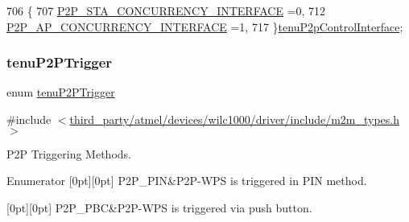 \begin{DoxyCode}
706              \{
707     \hyperlink{group__WlanEnums_ggaa1d900506fae03d738ed81234d0a4633acbbb47272c24868f48d51875ce99008b}{P2P\_STA\_CONCURRENCY\_INTERFACE}  =0,
712     \hyperlink{group__WlanEnums_ggaa1d900506fae03d738ed81234d0a4633a78839b56cae7844156e76d29f090dbf8}{P2P\_AP\_CONCURRENCY\_INTERFACE}    =1,
717 \}\hyperlink{group__WlanEnums_gaa1d900506fae03d738ed81234d0a4633}{tenuP2pControlInterface};
\end{DoxyCode}
\mbox{\label{group__WlanEnums_ga0b97cca65d26d6163cabcb708e5759df}} 
\subsubsection{\texorpdfstring{tenu\+P2\+P\+Trigger}{tenuP2PTrigger}}
{\footnotesize\ttfamily enum \hyperlink{group__WlanEnums_ga0b97cca65d26d6163cabcb708e5759df}{tenu\+P2\+P\+Trigger}}



{\ttfamily \#include $<$\hyperlink{m2m__types_8h}{third\+\_\+party/atmel/devices/wilc1000/driver/include/m2m\+\_\+types.\+h}$>$}



P2P Triggering Methods. 

\begin{DoxyEnumFields}{Enumerator}
[0pt][0pt]{}\mbox{\label{group__WlanEnums_gga0b97cca65d26d6163cabcb708e5759dfad460eb448f86bb487da38d2a4adc6056}} 
P2\+P\+\_\+\+P\+IN&P2\+P-\/\+W\+PS is triggered in P\+IN method. \\
\hline

[0pt][0pt]{}\mbox{\label{group__WlanEnums_gga0b97cca65d26d6163cabcb708e5759dfacf766568f64b21ce7adc08da42cf6ffd}} 
P2\+P\+\_\+\+P\+BC&P2\+P-\/\+W\+PS is triggered via push button. \\
\hline

\end{DoxyEnumFields}


